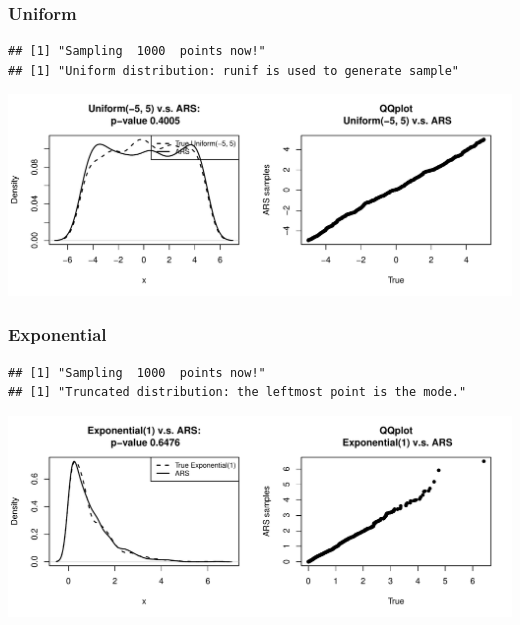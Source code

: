 \documentclass{article}\usepackage[]{graphicx}\usepackage[]{color}
\makeatletter
\def\maxwidth{ %
  \ifdim\Gin@nat@width>\linewidth
    \linewidth
  \else
    \Gin@nat@width
  \fi
}
\newenvironment{kframe}{%
 \def\at@end@of@kframe{}%
 \ifinner\ifhmode%
  \def\at@end@of@kframe{\end{minipage}}%
  \begin{minipage}{\columnwidth}%
 \fi\fi%
 \def\FrameCommand##1{\hskip\@totalleftmargin \hskip-\fboxsep
 \colorbox{shadecolor}{##1}\hskip-\fboxsep
     \hskip-\linewidth \hskip-\@totalleftmargin \hskip\columnwidth}%
 \MakeFramed {\advance\hsize-\width
   \@totalleftmargin\z@ \linewidth\hsize
   \@setminipage}}%
 {\par\unskip\endMakeFramed%
 \at@end@of@kframe}
\newenvironment{knitrout}{}{} %
\makeatother
\begin{document}
\subsubsection{Uniform}
\begin{knitrout}
\color{fgcolor}\begin{kframe}
\begin{verbatim}
## [1] "Sampling  1000  points now!"
## [1] "Uniform distribution: runif is used to generate sample"
\end{verbatim}
\end{kframe}
\includegraphics[width=\maxwidth]{figure/uniform-1} 

\end{knitrout}

\subsubsection{Exponential}
\begin{knitrout}
\color{fgcolor}\begin{kframe}
\begin{verbatim}
## [1] "Sampling  1000  points now!"
## [1] "Truncated distribution: the leftmost point is the mode."
\end{verbatim}
\end{kframe}
\includegraphics[width=\maxwidth]{figure/exponential-1} 

\end{knitrout}
\end{document}
